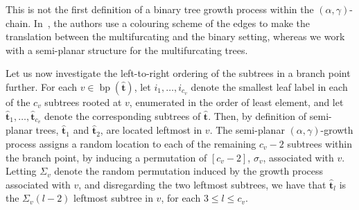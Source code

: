 \documentclass[a4paper, final]{amsart}
\theoremstyle{plain}
\theoremstyle{definition}
\newcommand{\that}[1][t]{\hat{\boldsymbol{#1}}} %
\DeclareMathOperator{\branchpoints}{bp}
\begin{document}
This is not the first definition of a binary tree growth process within the $(\alpha, \gamma)$-chain.
In~\cite{RefWorks:doc:5b4cbb5fe4b02dc0c79270af}, the authors use a colouring scheme of the edges to make the translation between the multifurcating and the binary setting, whereas we work with a semi-planar structure for the multifurcating trees.

Let us now investigate the left-to-right ordering of the subtrees in a branch point further.
For each $v \in \branchpoints(\that)$, let $i_1, \ldots, i_{c_v}$ denote the smallest leaf label in each of the $c_v$ subtrees rooted at $v$, enumerated in the order of least element, and let $\that_1, \ldots, \that_{c_v}$ denote the corresponding subtrees of $\that$.
Then, by definition of semi-planar trees, $\that_1$ and $\that_2$, are located leftmost in $v$.
The semi-planar $(\alpha, \gamma)$-growth process assigns a random location to each of the remaining $c_v - 2$ subtrees within the branch point, by inducing a permutation of $[c_v - 2]$, $\sigma_v$, associated with $v$.
Letting $\Sigma_v$ denote the random permutation induced by the growth process associated with $v$, and disregarding the two leftmost subtrees, we have that $\that_l$ is the $\Sigma_v(l - 2)$ leftmost subtree in $v$, for each $3 \leq l \leq c_v$. \\
\end{document}
